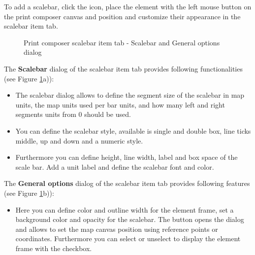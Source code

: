 To add a scalebar, click the 
icon, place the element with the left mouse button on the print composer
canvas and position and customize their appearance in the scalebar item tab.

\begin{figure}[ht]
\centering
{}
\hspace{1cm}
\caption{Print composer scalebar item tab - Scalebar and General options dialog \nixcaption}\label{fig:scalebaroptions}
\end{figure}


The \textbf{Scalebar} dialog of the scalebar item tab provides following
functionalities (see Figure \ref{fig:scalebaroptions}a)):

\begin{itemize}[label=--]
\item The scalebar dialog allows to define the segment size of the scalebar
in map units, the map units used per bar units, and how many left and right
segments units from 0 should be used.
\item You can define the scalebar style, available is single and double box,
line ticks middle, up and down and a numeric style.
\item Furthermore you can define height, line width, label and box space of
the scale bar. Add a unit label and define the scalebar font and color.
\end{itemize}


The \textbf{General options} dialog of the scalebar item tab provides following
features (see Figure \ref{fig:scalebaroptions}b)):

\begin{itemize}[label=--]
\item Here you can define color and outline width for the element frame, set
a background color and opacity for the scalebar. The 
button opens the  dialog and allows to set the map
canvas position using reference points or coordinates. Furthermore you can
select or unselect to display the element frame with the  checkbox.
\end{itemize}

